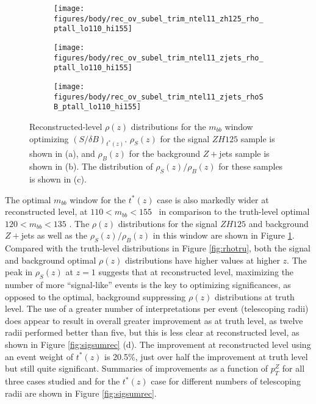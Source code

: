 \begin{figure}[!htbp]\captionsetup{justification=centering}
\begin{center}
\begin{subfigure}[t]{0.32\textwidth}\centering\texttt{[image: figures/body/rec\_ov\_subel\_trim\_ntel11\_zh125\_rho\_ptall\_lo110\_hi155]}\caption{}\end{subfigure}
\begin{subfigure}[t]{0.32\textwidth}\centering\texttt{[image: figures/body/rec\_ov\_subel\_trim\_ntel11\_zjets\_rho\_ptall\_lo110\_hi155]}\caption{}\end{subfigure}
\begin{subfigure}[t]{0.32\textwidth}\centering\texttt{[image: figures/body/rec\_ov\_subel\_trim\_ntel11\_zjets\_rhoSB\_ptall\_lo110\_hi155]}\caption{}\end{subfigure}
\caption{\label{fig:rhorec}Reconstructed-level $\rho\left(z\right)$ distributions for the $m_{bb}$ window optimizing $\left(S/\delta B\right)_{t^*\left(z\right)}$.  $\rho_S\left(z\right)$ for the signal $ZH125$ sample is shown in (a), and $\rho_B\left(z\right)$ for the background $Z+$jets sample is shown in (b).  The distribution of $\rho_S\left(z\right)/\rho_B\left(z\right)$ for these samples is shown in (c).}
\end{center}
\end{figure}

The optimal $m_{bb}$ window for the $t^*\left(z\right)$ case is also markedly wider at reconstructed level, at $110<m_{bb}<155$ \GeV\ in comparison to the truth-level optimal $120<m_{bb}<135$ \GeV.  The $\rho\left(z\right)$ distributions for the signal $ZH125$ and background $Z+$jets as well as the $\rho_S\left(z\right)/\rho_B\left(z\right)$ in this window are shown in Figure \ref{fig:rhorec}.  Compared with the truth-level distributions in Figure \ref{fig:rhotru}, both the signal and background optimal $\rho\left(z\right)$ distributions have higher values at higher $z$.  The peak in $\rho_S\left(z\right)$ at $z=1$ suggests that at reconstructed level, maximizing the number of more ``signal-like'' events is the key to optimizing significances, as opposed to the optimal, background suppressing  $\rho\left(z\right)$ distributions at truth level.  The use of a greater number of interpretations per event (telescoping radii) does appear to result in overall greater improvement as at truth level, as twelve radii performed better than five, but this is less clear at reconstructed level, as shown in Figure \ref{fig:sigsumrec} (d).  The improvement at reconstructed level using an event weight of $t^*\left(z\right)$ is 20.5\%, just over half the improvement at truth level but still quite significant.  Summaries of improvements as a function of $p_T^Z$ for all three cases studied and for the $t^*\left(z\right)$ case for different numbers of telescoping radii are shown in Figure \ref{fig:sigsumrec}.

